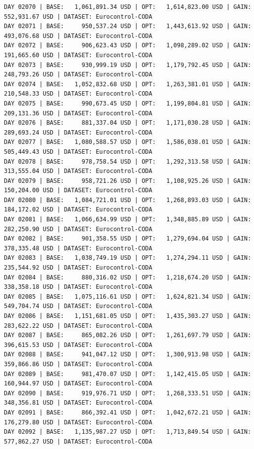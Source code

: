 \documentclass[11pt,a4paper]{article}
\begin{document}
\begin{verbatim}
DAY 02070 | BASE:   1,061,891.34 USD | OPT:   1,614,823.00 USD | GAIN: 552,931.67 USD | DATASET: Eurocontrol-CODA
DAY 02071 | BASE:     950,537.24 USD | OPT:   1,443,613.92 USD | GAIN: 493,076.68 USD | DATASET: Eurocontrol-CODA
DAY 02072 | BASE:     906,623.43 USD | OPT:   1,098,289.02 USD | GAIN: 191,665.60 USD | DATASET: Eurocontrol-CODA
DAY 02073 | BASE:     930,999.19 USD | OPT:   1,179,792.45 USD | GAIN: 248,793.26 USD | DATASET: Eurocontrol-CODA
DAY 02074 | BASE:   1,052,832.68 USD | OPT:   1,263,381.01 USD | GAIN: 210,548.33 USD | DATASET: Eurocontrol-CODA
DAY 02075 | BASE:     990,673.45 USD | OPT:   1,199,804.81 USD | GAIN: 209,131.36 USD | DATASET: Eurocontrol-CODA
DAY 02076 | BASE:     881,337.04 USD | OPT:   1,171,030.28 USD | GAIN: 289,693.24 USD | DATASET: Eurocontrol-CODA
DAY 02077 | BASE:   1,080,588.57 USD | OPT:   1,586,038.01 USD | GAIN: 505,449.43 USD | DATASET: Eurocontrol-CODA
DAY 02078 | BASE:     978,758.54 USD | OPT:   1,292,313.58 USD | GAIN: 313,555.04 USD | DATASET: Eurocontrol-CODA
DAY 02079 | BASE:     958,721.26 USD | OPT:   1,108,925.26 USD | GAIN: 150,204.00 USD | DATASET: Eurocontrol-CODA
DAY 02080 | BASE:   1,084,721.01 USD | OPT:   1,268,893.03 USD | GAIN: 184,172.02 USD | DATASET: Eurocontrol-CODA
DAY 02081 | BASE:   1,066,634.99 USD | OPT:   1,348,885.89 USD | GAIN: 282,250.90 USD | DATASET: Eurocontrol-CODA
DAY 02082 | BASE:     901,358.55 USD | OPT:   1,279,694.04 USD | GAIN: 378,335.48 USD | DATASET: Eurocontrol-CODA
DAY 02083 | BASE:   1,038,749.19 USD | OPT:   1,274,294.11 USD | GAIN: 235,544.92 USD | DATASET: Eurocontrol-CODA
DAY 02084 | BASE:     880,316.02 USD | OPT:   1,218,674.20 USD | GAIN: 338,358.18 USD | DATASET: Eurocontrol-CODA
DAY 02085 | BASE:   1,075,116.61 USD | OPT:   1,624,821.34 USD | GAIN: 549,704.74 USD | DATASET: Eurocontrol-CODA
DAY 02086 | BASE:   1,151,681.05 USD | OPT:   1,435,303.27 USD | GAIN: 283,622.22 USD | DATASET: Eurocontrol-CODA
DAY 02087 | BASE:     865,082.26 USD | OPT:   1,261,697.79 USD | GAIN: 396,615.53 USD | DATASET: Eurocontrol-CODA
DAY 02088 | BASE:     941,047.12 USD | OPT:   1,300,913.98 USD | GAIN: 359,866.86 USD | DATASET: Eurocontrol-CODA
DAY 02089 | BASE:     981,470.07 USD | OPT:   1,142,415.05 USD | GAIN: 160,944.97 USD | DATASET: Eurocontrol-CODA
DAY 02090 | BASE:     919,976.71 USD | OPT:   1,268,333.51 USD | GAIN: 348,356.81 USD | DATASET: Eurocontrol-CODA
DAY 02091 | BASE:     866,392.41 USD | OPT:   1,042,672.21 USD | GAIN: 176,279.80 USD | DATASET: Eurocontrol-CODA
DAY 02092 | BASE:   1,135,987.27 USD | OPT:   1,713,849.54 USD | GAIN: 577,862.27 USD | DATASET: Eurocontrol-CODA

\end{verbatim}
\end{document}
